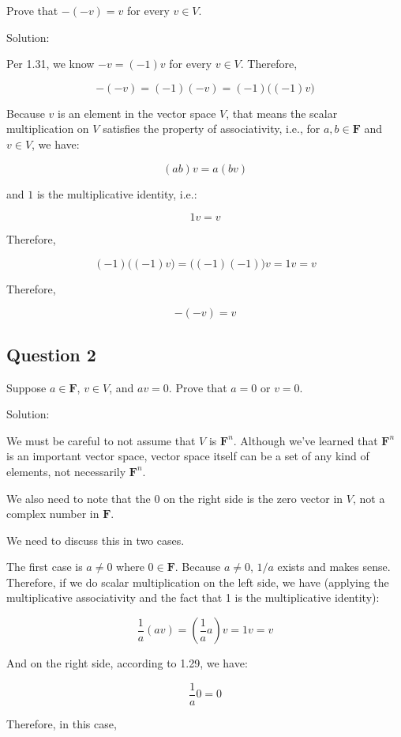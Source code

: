 \documentclass[12pt, letterpaper, oneside]{book}
\begin{document}
Prove that $-(-v) = v$ for every $v \in V$.

Solution:

Per 1.31, we know $-v = (-1)v$ for every $v \in V$. Therefore,

\[ -(-v) = (-1)(-v) = (-1)\bigl((-1)v\bigr) \]

Because $v$ is an element in the vector space $V$, that means the scalar
multiplication on $V$ satisfies the property of associativity, i.e., for $a, b
\in \mathbf{F}$ and $v \in V$, we have:

\[ (ab)v = a(bv)\]

and $1$ is the multiplicative identity, i.e.:

\[ 1v = v\]

Therefore,

\[ (-1)\bigl((-1)v\bigr) = \bigl((-1)(-1)\bigr)v = 1v = v \]

Therefore,

\[ -(-v) = v \]

\subsection{Question 2}

Suppose $a \in \mathbf{F}$, $v \in V$, and $av = 0$. Prove that $a = 0$ or
$v = 0$.

Solution:

We must be careful to not assume that $V$ is $\mathbf{F}^n$. Although we've
learned that $\mathbf{F}^n$ is an important vector space, vector space itself
can be a set of any kind of elements, not necessarily $\mathbf{F}^n$.

We also need to note that the $0$ on the right side is the zero vector in $V$,
not a complex number in $\mathbf{F}$.

We need to discuss this in two cases.

The first case is $a \neq 0$ where $0 \in \mathbf{F}$. Because $a \neq 0$,
$1/a$ exists and makes sense. Therefore, if we do scalar multiplication on the
left side, we have (applying the multiplicative associativity and the fact that
1 is the multiplicative identity):

\[ \frac{1}{a}(av) = (\frac{1}{a}a)v = 1v = v \]

And on the right side, according to 1.29, we have:

\[ \frac{1}{a}0 = 0 \]

Therefore, in this case,
\end{document}
